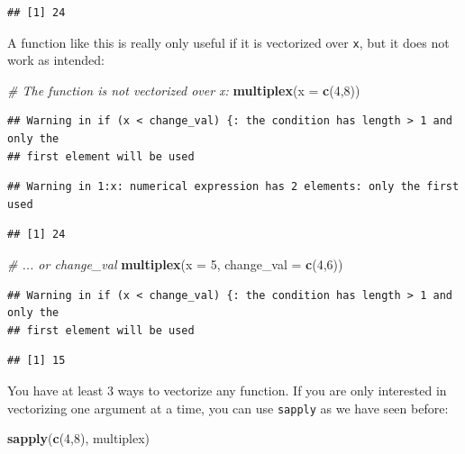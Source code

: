 \documentclass[]{book}
\newenvironment{Shaded}{\begin{snugshade}}{\end{snugshade}}
\newcommand{\CommentTok}[1]{\textcolor[rgb]{0.56,0.35,0.01}{\textit{#1}}}
\newcommand{\DataTypeTok}[1]{\textcolor[rgb]{0.13,0.29,0.53}{#1}}
\newcommand{\DecValTok}[1]{\textcolor[rgb]{0.00,0.00,0.81}{#1}}
\newcommand{\KeywordTok}[1]{\textcolor[rgb]{0.13,0.29,0.53}{\textbf{#1}}}
\newcommand{\NormalTok}[1]{#1}
\begin{document}
\begin{verbatim}
## [1] 24
\end{verbatim}

A function like this is really only useful if it is vectorized over \texttt{x}, but it does not work as intended:

\begin{Shaded}
\begin{Highlighting}[]
\CommentTok{# The function is not vectorized over x:}
\KeywordTok{multiplex}\NormalTok{(}\DataTypeTok{x =} \KeywordTok{c}\NormalTok{(}\DecValTok{4}\NormalTok{,}\DecValTok{8}\NormalTok{))}
\end{Highlighting}
\end{Shaded}

\begin{verbatim}
## Warning in if (x < change_val) {: the condition has length > 1 and only the
## first element will be used
\end{verbatim}

\begin{verbatim}
## Warning in 1:x: numerical expression has 2 elements: only the first used
\end{verbatim}

\begin{verbatim}
## [1] 24
\end{verbatim}

\begin{Shaded}
\begin{Highlighting}[]
\CommentTok{# ... or change_val}
\KeywordTok{multiplex}\NormalTok{(}\DataTypeTok{x =} \DecValTok{5}\NormalTok{, }\DataTypeTok{change_val =} \KeywordTok{c}\NormalTok{(}\DecValTok{4}\NormalTok{,}\DecValTok{6}\NormalTok{))}
\end{Highlighting}
\end{Shaded}

\begin{verbatim}
## Warning in if (x < change_val) {: the condition has length > 1 and only the
## first element will be used
\end{verbatim}

\begin{verbatim}
## [1] 15
\end{verbatim}

You have at least 3 ways to vectorize any function. If you are only interested in vectorizing one argument at a time, you can use \texttt{sapply} as we have seen before:

\begin{Shaded}
\begin{Highlighting}[]
\KeywordTok{sapply}\NormalTok{(}\KeywordTok{c}\NormalTok{(}\DecValTok{4}\NormalTok{,}\DecValTok{8}\NormalTok{), multiplex)}
\end{Highlighting}
\end{Shaded}
\end{document}
